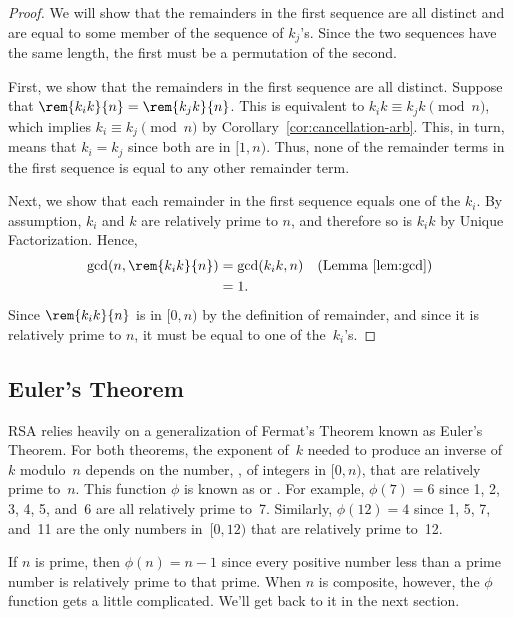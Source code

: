 \begin{proof}
We will show that the remainders in the first sequence are all distinct and are equal to
some member of the sequence of $k_j$'s.  Since the two sequences have the same length, the
first must be a permutation of the second.

First, we show that the remainders in the first sequence are all distinct.  Suppose that
$\rem{k_i k}{n} = \rem{k_j k}{n}$.  This is equivalent to $k_i k \equiv k_j k \pmod{n}$,
which implies $k_i \equiv k_j \pmod{n}$ by Corollary~\ref{cor:cancellation-arb}.  This, in
turn, means that $k_i = k_j$ since both are in $[1,n)$.  Thus, none of the remainder terms
  in the first sequence is equal to any other remainder term.

Next, we show that each remainder in the first sequence equals one of the $k_i$.  By
assumption, $k_i$ and $k$ are relatively prime to $n$, and therefore so is $k_ik$ by Unique
Factorization.  Hence,
\begin{align*}
\gcd(n, \rem{k_i k}{n}) & = \gcd(k_i k, n) & \text{(Lemma~\ref{lem:gcd})}\\ & = 1.
\end{align*}
Since $\rem{k_i k}{n}$ is in $[0, n)$ by the definition of remainder, and since it is
  relatively prime to $n$, it must be equal to one of the~$k_i$'s.
\end{proof}

\subsection{Euler's Theorem}

RSA relies heavily on a generalization of Fermat's Theorem known as Euler's Theorem.  For
both theorems, the exponent of~$k$ needed to produce an inverse of~$k$ modulo~$n$ depends
on the number, , of integers in $[0, n)$, that are relatively prime to~$n$.
  This function $\phi$ is known as  or
  .  For example, $\phi(7) = 6$ since 1, 2, 3, 4, 5, and~6 are all
  relatively prime to~7.  Similarly, $\phi(12) = 4$ since 1, 5, 7, and~11 are the only
  numbers in~$[0, 12)$ that are relatively prime to~12.

\iffalse \footnote{Recall that $\gcd(n, n) = n$ and so $n$ is never relatively prime to
  itself.}  \fi

If $n$ is prime, then $\phi(n) = n - 1$ since every positive number less than a prime
number is relatively prime to that prime.  When $n$ is composite, however, the $\phi$
function gets a little complicated.  We'll get back to it in the next section.

